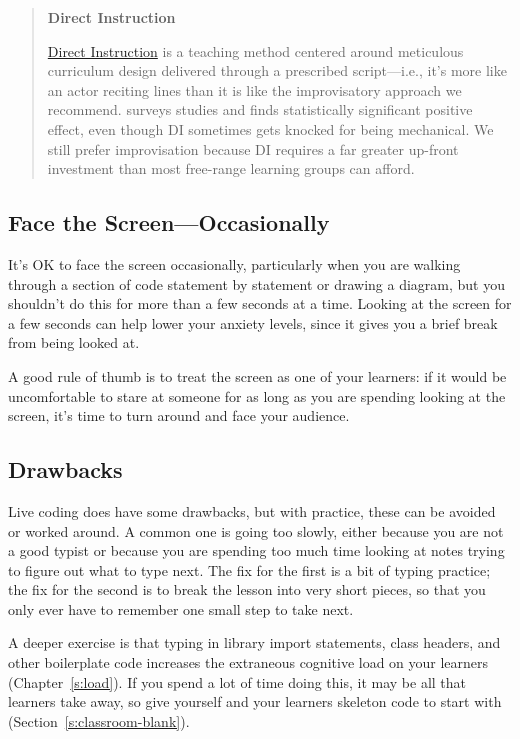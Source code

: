 \begin{quote}\setlength{\parindent}{0pt}
\textbf{Direct Instruction}

\protect\hyperlink{g:direct-instruction}{Direct Instruction} is a teaching
method centered around meticulous curriculum design delivered through
a prescribed script---i.e., it's more like an actor reciting lines than
it is like the improvisatory approach we recommend. \cite{Stoc2018}
surveys studies and finds statistically significant positive effect,
even though DI sometimes gets knocked for being mechanical. We still
prefer improvisation because DI requires a far greater up-front
investment than most free-range learning groups can afford.
\end{quote}

\subsection{Face the Screen---Occasionally}\label{face-the-screenoccasionally}

It's OK to face the screen occasionally, particularly when you are
walking through a section of code statement by statement or drawing a
diagram, but you shouldn't do this for more than a few seconds at a
time. Looking at the screen for a few seconds can help lower your
anxiety levels, since it gives you a brief break from being looked at.

A good rule of thumb is to treat the screen as one of your learners: if
it would be uncomfortable to stare at someone for as long as you are
spending looking at the screen, it's time to turn around and face your
audience.

\subsection{Drawbacks}\label{drawbacks}

Live coding does have some drawbacks, but with practice, these can be
avoided or worked around. A common one is going too slowly, either
because you are not a good typist or because you are spending too much
time looking at notes trying to figure out what to type next. The fix
for the first is a bit of typing practice; the fix for the second is to
break the lesson into very short pieces, so that you only ever have to
remember one small step to take next.

A deeper exercise is that typing in library import statements, class
headers, and other boilerplate code increases the extraneous cognitive
load on your learners (Chapter~\ref{s:load}). If you spend a lot of time
doing this, it may be all that learners take away, so give yourself and
your learners skeleton code to start with
(Section~\ref{s:classroom-blank}).

